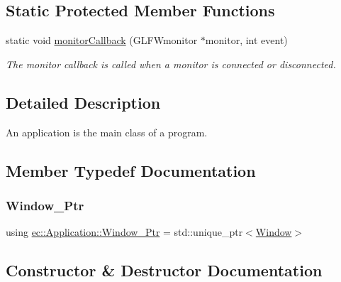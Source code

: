 \subsection*{Static Protected Member Functions}
\begin{DoxyCompactItemize}
\item 
static void \mbox{\hyperlink{classec_1_1_application_adaeb3f63d8e850d7b83f1c1b61bc73d1}{monitor\+Callback}} (G\+L\+F\+Wmonitor $\ast$monitor, int event)
\begin{DoxyCompactList}\small\item\em The monitor callback is called when a monitor is connected or disconnected. \end{DoxyCompactList}\end{DoxyCompactItemize}


\subsection{Detailed Description}
An application is the main class of a program. 

\subsection{Member Typedef Documentation}
\mbox{\label{classec_1_1_application_af1e09a0f1b603eab8d3245d8b8075ad5}} 
\subsubsection{\texorpdfstring{Window\+\_\+\+Ptr}{Window\_Ptr}}
{\footnotesize\ttfamily using \mbox{\hyperlink{classec_1_1_application_af1e09a0f1b603eab8d3245d8b8075ad5}{ec\+::\+Application\+::\+Window\+\_\+\+Ptr}} =  std\+::unique\+\_\+ptr$<$\mbox{\hyperlink{classec_1_1_window}{Window}}$>$}



\subsection{Constructor \& Destructor Documentation}
\mbox{\label{classec_1_1_application_af4a94888105d739a2de75be17ce9ad67}} 
